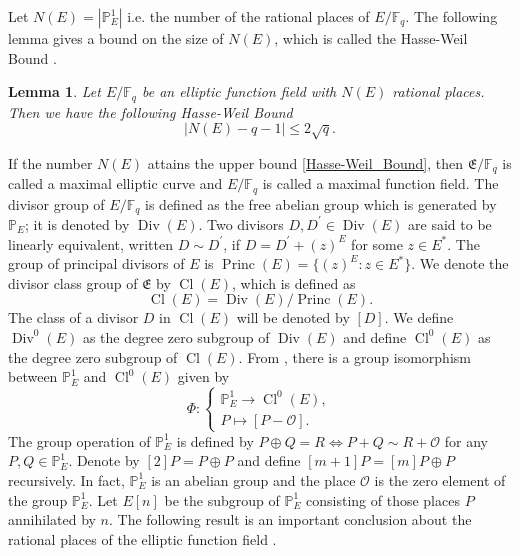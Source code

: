 \documentclass[journal,12pt,onecolumn]{IEEEtran}
\newtheorem{lemma}{Lemma}
\begin{document}
Let \(N(E) = |\mathbb{P}_E^1|\) i.e. the number of the rational places of \(E/\mathbb{F}_q\). The following lemma gives a bound on the size of $N(E)$, which is called the Hasse-Weil Bound \cite[Thm. 5.2.3]{Algebraic_Function_Fields_and_Codes}.

\begin{lemma}
    Let $E/\mathbb{F}_q$ be an elliptic function field with $N(E)$ rational places. Then we have the following Hasse-Weil Bound
    \begin{equation}\label{Hasse-Weil_Bound}
        |N(E)-q-1|\le 2\sqrt{q}.
    \end{equation}
\end{lemma}

If the number $N(E)$ attains the upper bound \eqref{Hasse-Weil_Bound}, then $\mathfrak{E}/\mathbb{F}_q$ is called a maximal elliptic curve and $E/\mathbb{F}_q$ is called a maximal function field. The divisor group of $E/\mathbb{F}_q$ is defined as the free abelian group which is generated by $\mathbb{P}_E$; it is denoted by $\operatorname{Div}(E)$. Two divisors $D,D^\prime\in\operatorname{Div}(E)$ are said to be linearly equivalent, written $D\sim D^\prime$, if $D=D^\prime+(z)^{E}$ for some $z\in E^*$. The group of principal divisors of $E$ is $\operatorname{Princ}(E) = \{(z)^E:z\in E^*\}$. We denote the divisor class group of $\mathfrak{E}$ by $\operatorname{Cl}(E)$, which is defined as
\[
    \operatorname{Cl}(E)=\operatorname{Div}(E)/\operatorname{Princ}(E).
\]
The class of a divisor $D$ in $\operatorname{Cl}(E)$ will be denoted by $[D]$. We define $\operatorname{Div}^0(E)$ as the degree zero subgroup of $\operatorname{Div}(E)$ and define $\operatorname{Cl}^0(E)$ as the degree zero subgroup of $\operatorname{Cl}(E)$. From \cite[Prop. 6.1.7]{Algebraic_Function_Fields_and_Codes}, there is a group isomorphism between \( \mathbb{P}_E^1 \) and \( \operatorname{Cl}^0(E) \) given by
\[
    \Phi : 
    \begin{cases} 
        \mathbb{P}_E^1 \to \operatorname{Cl}^0(E), \\ 
        P \mapsto [P - \mathcal{O}]. 
    \end{cases}
\]
The group operation of \( \mathbb{P}_E^1 \) is defined by \( P \oplus Q = R \iff P + Q \sim R + \mathcal{O} \) for any \( P, Q \in \mathbb{P}_E^1 \). Denote by \([2]P = P \oplus P\) and define \([m+1]P = [m]P \oplus P\) recursively. In fact, \( \mathbb{P}_E^1 \) is an abelian group and the place \( \mathcal{O} \) is the zero element of the group \( \mathbb{P}_E^1 \). Let \(E[n]\) be the subgroup of \(\mathbb{P}_E^1\) consisting of those places \(P\) annihilated by \(n\). The following result is an important conclusion about the rational places of the elliptic function field \cite[Prop. 6.1.6]{Algebraic_Function_Fields_and_Codes}. 
\end{document}
